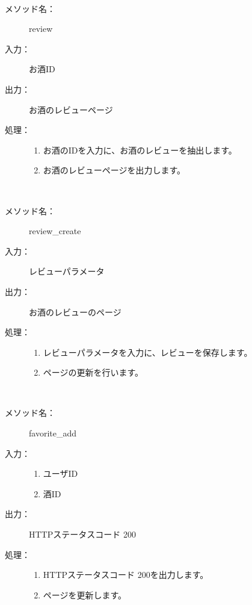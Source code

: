 \documentclass[a4j,titlepage]{jarticle}
\begin{document}
\clearpage
​
\begin{description}
\item [メソッド名：] review
\item [入力：] お酒ID
\item [出力：] お酒のレビューページ
\item [処理：]\mbox{}
  \begin{enumerate}
  \item お酒のIDを入力に、お酒のレビューを抽出します。
  \item お酒のレビューページを出力します。
  \end{enumerate}
\end{description}
​
\begin{description}
\item [メソッド名：] review\_create
\item [入力：] レビューパラメータ
\item [出力：] お酒のレビューのページ
\item [処理：]\mbox{}
  \begin{enumerate}
  \item レビューパラメータを入力に、レビューを保存します。
  \item ページの更新を行います。
  \end{enumerate}
\end{description}
​
\begin{description}
\item [メソッド名：] favorite\_add
\item [入力：]
  \begin{enumerate}
    \item ユーザID
    \item 酒ID
  \end{enumerate}
\item [出力：] HTTPステータスコード 200
\item [処理：] \mbox{}
  \begin{enumerate}
  \item HTTPステータスコード 200を出力します。
  \item ページを更新します。
　\end{enumerate}
\end{description}
\end{document}
